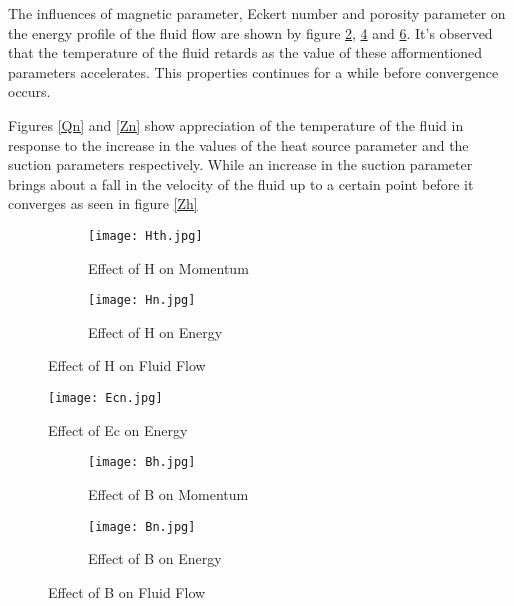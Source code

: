 \documentclass[a4paper,12pt]{report}
\begin{document}
{The influences of magnetic parameter, Eckert number and porosity parameter on the energy profile of the fluid flow are shown by figure \ref{Hn}, \ref{Figure 4.1: Effect of Ec on Fluid Flow} and \ref{Bn}. It's observed that the temperature of the fluid retards as the value of these afformentioned parameters accelerates. This properties continues for a while before convergence occurs.

Figures \ref{Qn} and \ref{Zn} show appreciation of the temperature of the fluid in response to the increase in the values of the heat source parameter and the suction parameters respectively. While an increase in the suction parameter brings about a fall in the velocity of the fluid up to a certain point before it converges as seen in figure \ref{Zh}  
\begin{figure}[h]
\centering
\begin{subfigure}{0.5\textwidth}
  \centering
  \texttt{[image: Hth.jpg]}
  \caption{Effect of H on Momentum}
  \label{Hh}
\end{subfigure}%
\hfill
\begin{subfigure}{0.5\textwidth}
  \centering
  \texttt{[image: Hn.jpg]}
  \caption{Effect of H on Energy}
  \label{Hn}
\end{subfigure}%
\caption{Effect of H on Fluid Flow}
\label{Figure 4.1: Effect of H on Fluid Flow}
\end{figure}
\begin{figure}[h]
\centering
  \texttt{[image: Ecn.jpg]}
\caption{Effect of Ec on Energy}
\label{Figure 4.1: Effect of Ec on Fluid Flow}
\end{figure}
\begin{figure}[h]
\centering
\begin{subfigure}{0.5\textwidth}
  \centering
  \texttt{[image: Bh.jpg]}
  \caption{Effect of B on Momentum}
  \label{Bh}
\end{subfigure}%
\hfill
\begin{subfigure}{0.5\textwidth}
  \centering
  \texttt{[image: Bn.jpg]}
  \caption{Effect of B on Energy}
  \label{Bn}
\end{subfigure}%
\caption{Effect of B on Fluid Flow}
\label{Figure 4.1: Effect of B on Fluid Flow}
\end{figure}
\begin{figure}[h]
\centering
\begin{subfigure}{0.5\textwidth}

\end{subfigure}
\end{figure}}
\end{document}
